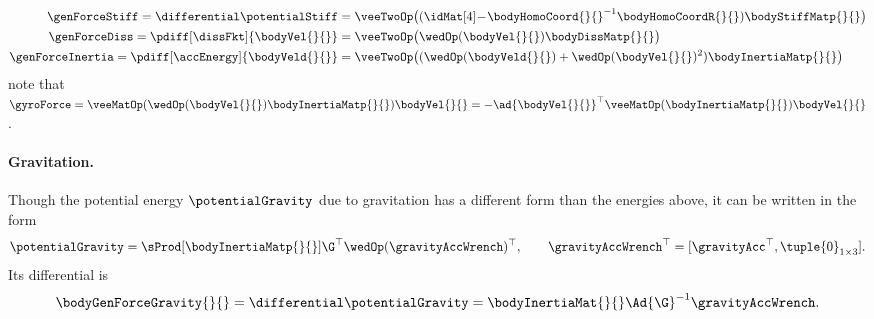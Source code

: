 \begin{subequations}
\begin{align}
 \genForceStiff = \differential \potentialStiff
 &= \veeTwoOp \big( (\idMat[4] \!-\! \bodyHomoCoord{}{}^{-1} \bodyHomoCoordR{}{}) \bodyStiffMatp{}{} \big)
\\
 \genForceDiss = \pdiff[\dissFkt]{\bodyVel{}{}}
 &= \veeTwoOp \big( \wedOp(\bodyVel{}{}) \bodyDissMatp{}{} \big)
\\
 \genForceInertia = \pdiff[\accEnergy]{\bodyVeld{}{}}
 &= \veeTwoOp \big( (\wedOp(\bodyVeld{}{}) + \wedOp(\bodyVel{}{})^2) \bodyInertiaMatp{}{} \big)
\end{align} 
\end{subequations}
note that $\gyroForce = \veeMatOp(\wedOp(\bodyVel{}{}) \bodyInertiaMatp{}{}) \bodyVel{}{} = -\ad{\bodyVel{}{}}^\top \veeMatOp(\bodyInertiaMatp{}{}) \bodyVel{}{}$.



\paragraph{Gravitation.}
Though the potential energy $\potentialGravity$ due to gravitation has a different form than the energies above, it can be written in the form
\begin{align}\label{eq:RBPotentialEnergyGravity2}
 \potentialGravity = \sProd[\bodyInertiaMatp{}{}]{\G^\top}{\wedOp(\gravityAccWrench)^\top},
\qquad 
 \gravityAccWrench^\top = [\gravityAcc^\top, \tuple{0}_{1\times3} ].
\end{align}
Its differential is
\begin{align}
 \bodyGenForceGravity{}{} = \differential\potentialGravity = \bodyInertiaMat{}{} \Ad{\G}^{-1} \gravityAccWrench.
\end{align}

